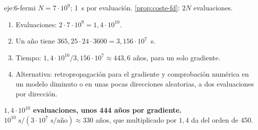 \begin{solucion}{eje:6-fermi}
\datos $N=7\cdot 10^{9}$; 1~s por evaluación.
\planteamiento \cref{prop:coste-fd}: $2N$ evaluaciones.
\pasos
\begin{enumerate}[label=\arabic*.]
  \item Evaluaciones: $2\cdot 7\cdot 10^{9}=1{,}4\cdot 10^{10}$.
  \item Un año tiene $365{,}25\cdot 24\cdot 3600=3{,}156\cdot 10^{7}$~s.
  \item Tiempo: $1{,}4\cdot 10^{10}/3{,}156\cdot 10^{7}\approx 443{,}6$ años, para un solo gradiente.
  \item Alternativa: retropropagación para el gradiente y comprobación numérica en un modelo diminuto o en unas pocas direcciones aleatorias, a dos evaluaciones por dirección.
\end{enumerate}
\resultado \textbf{$1{,}4\cdot 10^{10}$ evaluaciones, unos 444 años por gradiente.}
\comprobacion $10^{10}\text{ s}/(3\cdot 10^{7}\text{ s/año})\approx 330$ años, que multiplicado por $1{,}4$ da del orden de 450.
\end{solucion}

